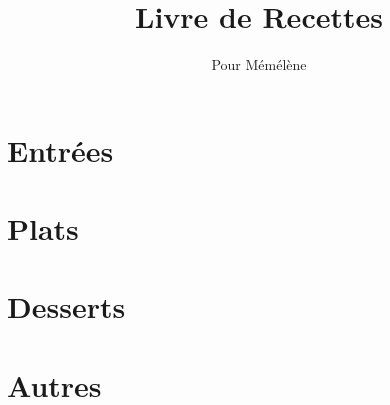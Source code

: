\documentclass{recipe-book}
\title{Livre de Recettes}
\author{Pour Mémélène}
\date{}
\begin{document}
\chapter{Entrées}

\chapter{Plats}

\chapter{Desserts}

\chapter{Autres}
\end{document}
